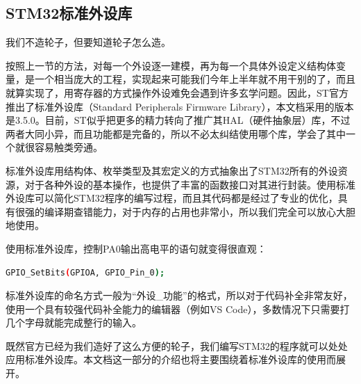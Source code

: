 \subsection{STM32标准外设库}
我们不造轮子，但要知道轮子怎么造。
\par 
按照上一节的方法，对每一个外设逐一建模，再为每一个具体外设定义结构体变量，是一个相当庞大的工程，实现起来可能我们今年上半年就不用干别的了，而且就算实现了，用寄存器的方式操作外设难免会遇到许多玄学问题。因此，ST官方推出了标准外设库（Standard Peripherals Firmware Library），本文档采用的版本是3.5.0。目前，ST似乎把更多的精力转向了推广其\acs{HAL}（硬件抽象层）库，不过两者大同小异，而且功能都是完备的，所以不必太纠结使用哪个库，学会了其中一个就很容易触类旁通。
\par 
标准外设库用结构体、枚举类型及其宏定义的方式抽象出了STM32所有的外设资源，对于各种外设的基本操作，也提供了丰富的函数接口对其进行封装。使用标准外设库可以简化STM32程序的编写过程，而且其代码都是经过了专业的优化，具有很强的编译期查错能力，对于内存的占用也非常小，所以我们完全可以放心大胆地使用。
\par 
使用标准外设库，控制PA0输出高电平的语句就变得很直观：
\par
\begin{lstlisting}[language=bash, style=customStyleC, caption=控制PA0输出高电平]
GPIO_SetBits(GPIOA, GPIO_Pin_0);
\end{lstlisting}
\par
标准外设库的命名方式一般为“外设\_功能”的格式，所以对于代码补全非常友好，使用一个具有较强代码补全能力的编辑器（例如VS Code），多数情况下只需要打几个字母就能完成整行的输入。
\par 
既然官方已经为我们造好了这么方便的轮子，我们编写STM32的程序就可以处处应用标准外设库。本文档这一部分的介绍也将主要围绕着标准外设库的使用而展开。

